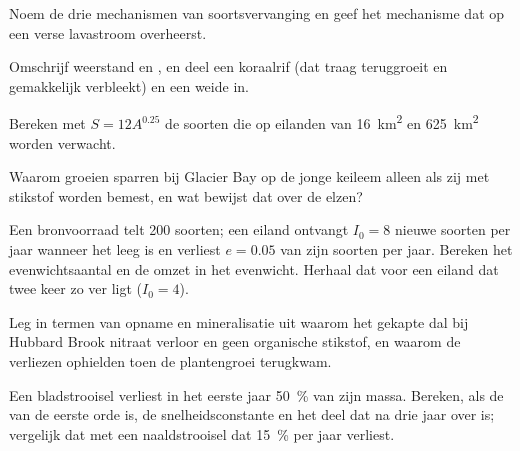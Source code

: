 \begin{exercise}[$\star$]\label{exo:b1:ecosystem-dynamics:2}
Noem de drie mechanismen van soortsvervanging en geef het mechanisme dat op
een verse lavastroom overheerst.
\end{exercise}

\begin{exercise}[$\star$]\label{exo:b1:ecosystem-dynamics:3}
Omschrijf weerstand en , en deel een koraalrif (dat traag
teruggroeit en gemakkelijk verbleekt) en een weide in.
\end{exercise}

\begin{exercise}[$\star$]\label{exo:b1:ecosystem-dynamics:4}
Bereken met $S = 12 A^{0.25}$ de soorten die op eilanden van \qty{16}{km^2}
en \qty{625}{km^2} worden verwacht.
\end{exercise}

\begin{exercise}[$\star\star$]\label{exo:b1:ecosystem-dynamics:5}
Waarom groeien sparren bij Glacier Bay op de jonge keileem alleen als zij met
stikstof worden bemest, en wat bewijst dat over de elzen?
\end{exercise}

\begin{exercise}[$\star\star$]\label{exo:b1:ecosystem-dynamics:6}
Een bronvoorraad telt 200 soorten; een eiland ontvangt $I_0 = 8$ nieuwe
soorten per jaar wanneer het leeg is en verliest $e = 0.05$ van zijn soorten
per jaar. Bereken het evenwichtsaantal en de omzet in het evenwicht. Herhaal
dat voor een eiland dat twee keer zo ver ligt ($I_0 = 4$).
\end{exercise}

\begin{exercise}[$\star\star$]\label{exo:b1:ecosystem-dynamics:7}
Leg in termen van opname en mineralisatie uit waarom het gekapte dal bij
Hubbard Brook nitraat verloor en geen organische stikstof, en waarom de
verliezen ophielden toen de plantengroei terugkwam.
\end{exercise}

\begin{exercise}[$\star\star$]\label{exo:b1:ecosystem-dynamics:8}
Een bladstrooisel verliest in het eerste jaar \qty{50}{\%} van zijn massa.
Bereken, als de  van de eerste orde is, de snelheidsconstante en het
deel dat na drie jaar over is; vergelijk dat met een naaldstrooisel dat
\qty{15}{\%} per jaar verliest.
\end{exercise}

